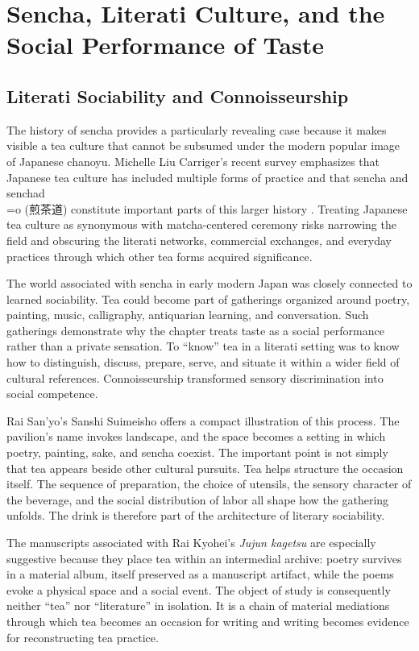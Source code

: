 \documentclass[numbers]{IntechOpen-Book}
\newcommand{\zh}[1]{{\CJKfontspec{Noto Serif CJK SC}\upshape #1}}
\begin{document}
\section{Sencha, Literati Culture, and the Social Performance of Taste}

\subsection{Literati Sociability and Connoisseurship}

The history of sencha provides a particularly revealing case because it makes visible a tea culture that cannot be subsumed under the modern popular image of Japanese chanoyu. Michelle Liu Carriger's recent survey emphasizes that Japanese tea culture has included multiple forms of practice and that sencha and senchad\\=o (\zh{煎茶道}) constitute important parts of this larger history \cite{carriger}. Treating Japanese tea culture as synonymous with matcha-centered ceremony risks narrowing the field and obscuring the literati networks, commercial exchanges, and everyday practices through which other tea forms acquired significance.

The world associated with sencha in early modern Japan was closely connected to learned sociability. Tea could become part of gatherings organized around poetry, painting, music, calligraphy, antiquarian learning, and conversation. Such gatherings demonstrate why the chapter treats taste as a social performance rather than a private sensation. To ``know'' tea in a literati setting was to know how to distinguish, discuss, prepare, serve, and situate it within a wider field of cultural references. Connoisseurship transformed sensory discrimination into social competence.

Rai San'yo's Sanshi Suimeisho offers a compact illustration of this process. The pavilion's name invokes landscape, and the space becomes a setting in which poetry, painting, sake, and sencha coexist. The important point is not simply that tea appears beside other cultural pursuits. Tea helps structure the occasion itself. The sequence of preparation, the choice of utensils, the sensory character of the beverage, and the social distribution of labor all shape how the gathering unfolds. The drink is therefore part of the architecture of literary sociability.

The manuscripts associated with Rai Kyohei's \textit{Jujun kagetsu} are especially suggestive because they place tea within an intermedial archive: poetry survives in a material album, itself preserved as a manuscript artifact, while the poems evoke a physical space and a social event. The object of study is consequently neither ``tea'' nor ``literature'' in isolation. It is a chain of material mediations through which tea becomes an occasion for writing and writing becomes evidence for reconstructing tea practice.
\end{document}
